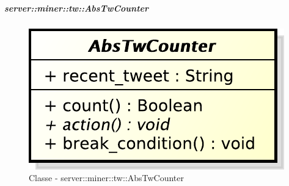 	\subparagraph{server::miner::tw::AbsTwCounter} %
		\label{subp:server_miner_tw_AbsTwCounter}
		    \begin{figure}[!htbp]
 		 		\centering
 				\centerline{\includegraphics[scale=0.75]{./images/server/classes/miner/abs_tw_counter.pdf}}
 				\caption{Classe - server::miner::tw::AbsTwCounter}
			\end{figure}
